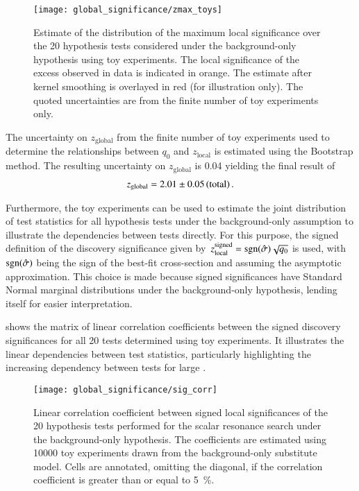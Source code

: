 \begin{figure}[htbp]
  \centering

  \texttt{[image: global\_significance/zmax\_toys]}

  \caption{Estimate of the distribution of the maximum local significance over
    the 20 hypothesis tests considered under the background-only hypothesis
    using toy experiments. The local significance of the excess observed in data
    is indicated in orange. The estimate after kernel smoothing is overlayed in
    red (for illustration only). The quoted uncertainties are from the finite
    number of toy experiments only.}%
  \label{fig:zmax_toys}
\end{figure}

The uncertainty on $z_{\text{global}}$ from the finite number of toy experiments
used to determine the relationships between $q_0$ and $z_{\text{local}}$ is
estimated using the Bootstrap method. The resulting uncertainty on
$z_{\text{global}}$ is \num{0.04} yielding the final result of
\begin{align*}
  z_{\text{global}} = \num{2.01}\numerrt{0.05}{total} \,\text{.}
\end{align*}


Furthermore, the toy experiments can be used to estimate the joint distribution
of test statistics for all hypothesis tests under the background-only assumption
to illustrate the dependencies between tests directly. For this purpose, the
signed definition of the discovery significance given
by~$z_{\text{local}}^{\text{signed}} = \operatorname{sgn}(\hat{\sigma}) \sqrt{q_0}$ is used,
with $\operatorname{sgn}(\hat{\sigma})$ being the sign of the best-fit cross-section and
assuming the asymptotic approximation. This choice is made because signed
significances have Standard Normal marginal distributions under the
background-only hypothesis, lending itself for easier interpretation.

 shows the matrix of linear correlation coefficients between
the signed discovery significances for all 20 tests determined using toy
experiments. It illustrates the linear dependencies between test statistics,
particularly highlighting the increasing dependency between tests for large \mX.

\begin{figure}[htbp]
  \centering

  \texttt{[image: global\_significance/sig\_corr]}

  \caption{Linear correlation coefficient between signed local significances of
    the 20 hypothesis tests performed for the scalar resonance search under the
    background-only hypothesis. The coefficients are estimated using \num{10000}
    toy experiments drawn from the background-only substitute model. Cells are
    annotated, omitting the diagonal, if the correlation coefficient is greater
    than or equal to \SI{5}{\percent}.}%
  \label{fig:corr_sig}
\end{figure}

